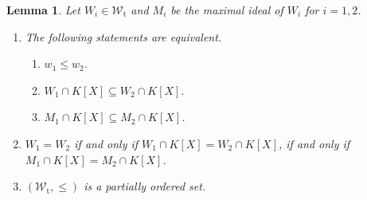 \documentclass[10pt]{article}
\numberwithin{equation}{section}
\newtheorem{Lem}[equation]{Lemma}
\theoremstyle{definition}
\theoremstyle{definition}
\renewcommand{\t}{\text{t}}
\begin{document}
\begin{Lem}\label{ordering}
Let $W_i \in \mathcal W_{\t}$ and $M_i$ be the maximal ideal of $W_i$ for $i=1,2$.
\begin{enumerate}
\item[{\em (1)}] The following statements are equivalent.
\begin{enumerate}
\item[{\em (a)}] $w_1\leq w_2$.
\item[{\em (b)}] $W_1\cap K[X]\subseteq W_2\cap K[X].$ 
\item[{\em (c)}] $M_1\cap K[X]\subseteq M_2\cap K[X]$.
\end{enumerate}
\item[{\em (2)}] $W_1=W_2$ if and only if $W_1\cap K[X]=W_2\cap K[X]$, if and only if $M_1\cap K[X] = M_2\cap K[X]$. 
\item[{\em (3)}] $(\mathcal W_{\t}, \leq)$ is a partially ordered set.
\end{enumerate}
\end{Lem} 
\end{document}
